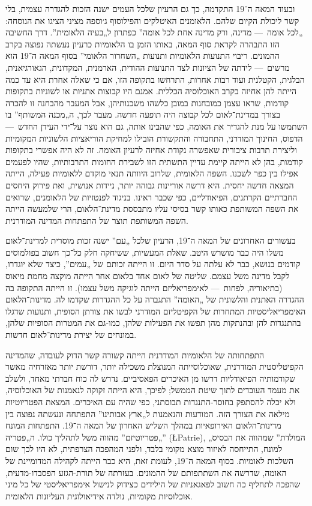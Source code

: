 ובעוד המאה ה־19 התקדמה, כך גם הרעיון שלכל העמים ישנה הזכות להגדרה עצמית, בלי קשר ליכולת הקיום שלהם. הלאומנים האיטלקים והפילוסוף ג׳וספה מציני הציגו את הנוסחה: „לכל אומה~— מדינה, ורק מדינה אחת לכל אומה” כפתרון ל„בעיה הלאומית”. דרך החשיבה הזו התבהרה לקראת סוף המאה, באותו הזמן בו הלאומיות כרעיון נעשתה נפוצה בקרב ההמונים. ריבוי התנועות הלאומיות ותנועות „השחרור הלאומי” בסוף המאה ה־19 הוא מרשים~— לידתה של הציונות לצד התנועות ההודית, הארמנית, המקדונית, הגאורגיאנית, הבלגית, הקטלנית ועוד רבות אחרות, התרחשו בתקופה הזו, אם כי שאלה אחרת היא עד כמה הייתה להן אחיזה בקרב האוכלוסיה הכללית. אמנם היו קבוצות אתניות או לשוניות בתקופות קודמות, שראו עצמן כמובחנות במובן כלשהו משכנותיהן, אבל המעבר מהבחנה זו להכרה בצורך במדינת־לאום לכל קבוצה היה תופעה חדשה. מעבר לכך, ה„מכנה המשותף” בו השתמשו על מנת להגדיר את האומה, כפי שהבינו אותה, גם הוא נוצר על־ידי העידן החדש~— הדפוס, החינוך המודרני, התחבורה והתקשורת הובילו למחיקת הוריאציות הלשוניות המקומיות וליצירת תרבות ציבורית שאפשרה נקודת אחיזה לרעיון האומה. זה לא היה אפשרי בתקופות קודמות, בהן לא הייתה קיימת עדיין התשתית הזו לשבירת החומות התרבותיות, שהיו לפעמים אפילו בין כפר לשכנו. השפה הלאומית, שלרוב היוותה תנאי מוקדם ללאומיות פעילה, הייתה המצאה חדשה יחסית. היא דרשה אוריינות גבוהה יותר, ניידות אנושית, ואת פירוק היחסים החברתיים הקרתנים, הפיאודליים, כפי שכבר ראינו. בניגוד לפנטזיות של הלאומנים, שרואים את השפה המשותפת כאותו קשר בסיסי עליו מתבססת מדינת־הלאום, הרי שלמעשה הייתה השפה המשותפת תוצר של התפתחות המדינה המודרנית.

בעשורים האחרונים של המאה ה־19, הרעיון שלכל „עם” ישנה זכות מוסרית למדינת־לאום משלו היה כבר מושרש היטב. שאלת המעשיות, ששיחקה חלק כל־כך חשוב בפולמוסים קודמים בנושא, כבר לא עלתה על סדר היום. זו הייתה זכותם של „עמים”, כיצד שלא יוגדרו, לקבל מדינה משל עצמם. שליטה של לאום אחד בלאום אחר הייתה מוקצה מחמת מיאוס (בתיאוריה, לפחות~— לאימפריאליזם הייתה לוגיקה משל עצמו). זו הייתה התקופה בה ההגדרה האתנית והלשונית של „האומה” התגברה על כל ההגדרות שקדמו לה. מדינות־הלאום האימפריאליסטיות המתחרות של הקפיטליזם המודרני לבשו את צורתן הסופית, ותנועות שדגלו בהתנגדות להן ובהנתקות מהן תפשו את הפעילות שלהן, כמו-גם את המטרות הסופיות שלהן, במונחים של יצירת מדינות־לאום חדשות.

התפתחותה של הלאומיות המודרנית הייתה קשורה קשר הדוק לעובדה, שהמדינה הקפיטליסטית המודרנית, שאוכלוסייתה המנוצלת משכילה יותר, דורשת יותר מאזרחיה מאשר שקודמותיה הפיאודליות דרשו מן האיכרים הפאסיביים. נדרש לה כוח חברתי מאחד, ולשלב את מעמד העובדים לתוך שיטת הממשל; לפיכך, היא הייתה זקוקה לנאמנות של האוכלוסיה, ולא יכלה להסתפק בחוסר-התנגדות תבוסתני, כפי שהיה עם האיכרים. המצאת הפטריוטיות מילאה את הצורך הזה. המודעות והנאמנות ל„ארץ אבותינו” התפתחה ונעשתה נפוצה בין מדינות־הלאום האירופאיות במהלך השליש האחרון של המאה ה־19. התפתחות המונח „פטריוטיזם” מהווה משל לתהליך כולו. ה„פטריה” (\L{Patrie}), „המולדת” שמהווה את הבסיס למונח, התייחסה לאיזור מוצא מקומי בלבד, ולפני המהפכה הצרפתית, לא היו לכך שום השלכות לאומיות. בסוף המאה ה־19, לעומת זאת, היא כבר הייתה לקהילה המדומיינת של האומה, שדרשה את השתתפותם של ההמונים. בעזרתה של תורת-הגזע הפסבדו-מדעית, שהפכה לתחליף כה חשוב לפאגאניות של הילידים כצידוק לנישול אימפריאליסטי של כל מיני אוכלוסיות מקומיות, נולדה אידיאולוגית העליונות הלאומית.

